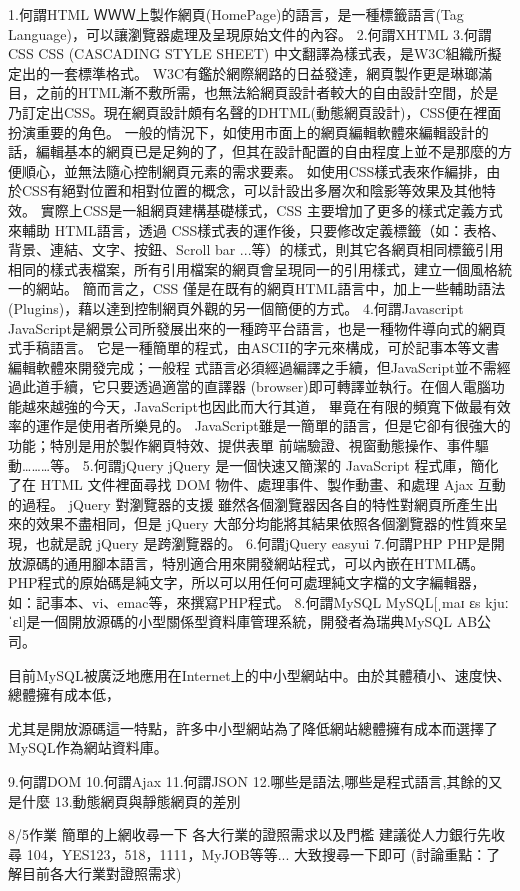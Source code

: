 1.何謂HTML
ＷＷＷ上製作網頁(HomePage)的語言，是一種標籤語言(Tag Language)，可以讓瀏覽器處理及呈現原始文件的內容。
2.何謂XHTML
3.何謂CSS
CSS (CASCADING STYLE SHEET) 中文翻譯為樣式表，是W3C組織所擬定出的一套標準格式。
W3C有鑑於網際網路的日益發達，網頁製作更是琳瑯滿目，之前的HTML漸不敷所需，也無法給網頁設計者較大的自由設計空間，於是乃訂定出CSS。現在網頁設計頗有名聲的DHTML(動態網頁設計)，CSS便在裡面扮演重要的角色。
一般的情況下，如使用市面上的網頁編輯軟體來編輯設計的話，編輯基本的網頁已是足夠的了，但其在設計配置的自由程度上並不是那麼的方便順心，並無法隨心控制網頁元素的需求要素。
如使用CSS樣式表來作編排，由於CSS有絕對位置和相對位置的概念，可以計設出多層次和陰影等效果及其他特效。 
實際上CSS是一組網頁建構基礎樣式，CSS 主要增加了更多的樣式定義方式來輔助 HTML語言，透過 CSS樣式表的運作後，只要修改定義標籤（如：表格、背景、連結、文字、按鈕、Scroll bar ...等）的樣式，則其它各網頁相同標籤引用相同的樣式表檔案，所有引用檔案的網頁會呈現同一的引用樣式，建立一個風格統一的網站。
簡而言之，CSS 僅是在既有的網頁HTML語言中，加上一些輔助語法(Plugins)，藉以達到控制網頁外觀的另一個簡便的方式。
4.何謂Javascript
JavaScript是網景公司所發展出來的一種跨平台語言，也是一種物件導向式的網頁式手稿語言。 
它是一種簡單的程式，由ASCII的字元來構成，可於記事本等文書編輯軟體來開發完成；一般程 式語言必須經過編譯之手續，但JavaScript並不需經過此道手續，它只要透過適當的直譯器 (browser)即可轉譯並執行。在個人電腦功能越來越強的今天，JavaScript也因此而大行其道， 畢竟在有限的頻寬下做最有效率的運作是使用者所樂見的。 
JavaScript雖是一簡單的語言，但是它卻有很強大的功能；特別是用於製作網頁特效、提供表單 前端驗證、視窗動態操作、事件驅動………等。 
5.何謂jQuery
jQuery 是一個快速又簡潔的 JavaScript 程式庫，簡化了在 HTML 文件裡面尋找 DOM 物件、處理事件、製作動畫、和處理 Ajax 互動的過程。
jQuery 對瀏覽器的支援
雖然各個瀏覽器因各自的特性對網頁所產生出來的效果不盡相同，但是 jQuery 大部分均能將其結果依照各個瀏覽器的性質來呈現，也就是說 jQuery 是跨瀏覽器的。
6.何謂jQuery easyui
7.何謂PHP
PHP是開放源碼的通用腳本語言，特別適合用來開發網站程式，可以內嵌在HTML碼。
PHP程式的原始碼是純文字，所以可以用任何可處理純文字檔的文字編輯器，
如：記事本、vi、emac等，來撰寫PHP程式。
8.何謂MySQL
MySQL[ˌmaɪ ɛs kjuː ˈɛl]是一個開放源碼的小型關係型資料庫管理系統，開發者為瑞典MySQL AB公司。

目前MySQL被廣泛地應用在Internet上的中小型網站中。由於其體積小、速度快、總體擁有成本低，

尤其是開放源碼這一特點，許多中小型網站為了降低網站總體擁有成本而選擇了MySQL作為網站資料庫。

9.何謂DOM
10.何謂Ajax
11.何謂JSON
12.哪些是語法,哪些是程式語言,其餘的又是什麼
13.動態網頁與靜態網頁的差別

8/5作業
簡單的上網收尋一下
各大行業的證照需求以及門檻
建議從人力銀行先收尋
104，YES123，518，1111，MyJOB等等...
大致搜尋一下即可
(討論重點：了解目前各大行業對證照需求)

